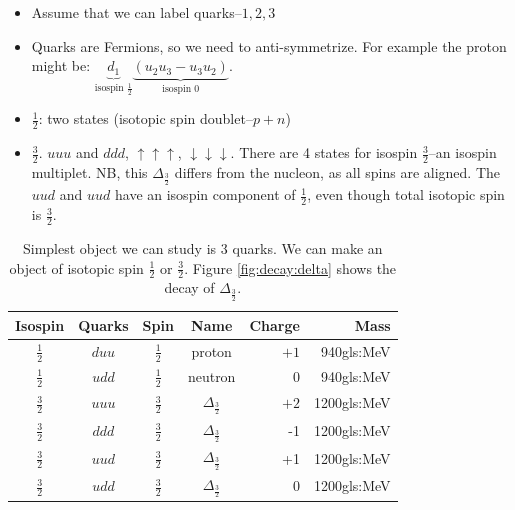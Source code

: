 \documentclass[]{article}
\begin{document}
\begin{itemize}
	\item Assume that we can label quarks--${1,2,3}$
	\item Quarks are Fermions, so we need to anti-symmetrize. For example the proton might be: $\underbrace{d_1}_\text{isospin $\frac{1}{2}$}\underbrace{(u_2u_3-u_3u_2)}_\text{isospin 0}$.
	\item $\frac{1}{2}$: two states (isotopic spin doublet--$p+n$)
	\item $\frac{3}{2}$. $uuu$ and $ddd$, $\uparrow\uparrow\uparrow$, $\downarrow\downarrow\downarrow$. There are 4 states for isospin $\frac{3}{2}$--an isospin multiplet. NB, this $\Delta_\frac{3}{2}$ differs from the nucleon, as all spins are aligned. The $uud$ and $uud$ have an isospin component of $\frac{1}{2}$, even though total isotopic spin is $\frac{3}{2}$.
\end{itemize}

\begin{table}[H]
	\begin{center}
		\caption[Simplest object we can study is 3 quarks.]{Simplest object we can study is 3 quarks. We can make an object of isotopic spin $\frac{1}{2}$ or $\frac{3}{2}$. Figure \ref{fig:decay:delta} shows the decay of $\Delta_\frac{3}{2}$.}\label{table:3quark}
		\begin{tabular}{|c|c|c|c|r|r|}\hline
			Isospin&Quarks&Spin&Name&Charge&Mass\\ \hline
			$\frac{1}{2}$&$duu$&$\frac{1}{2}$&proton&$+1$&940\gls{gls:MeV}\\ \hline
			$\frac{1}{2}$&$udd$&$\frac{1}{2}$&neutron&0&940\gls{gls:MeV}\\ \hline
			$\frac{3}{2}$&$uuu$&$\frac{3}{2}$&$\Delta_\frac{3}{2}$&$+2$&1200\gls{gls:MeV}\\ \hline
			$\frac{3}{2}$&$ddd$&$\frac{3}{2}$&$\Delta_\frac{3}{2}$&-1&1200\gls{gls:MeV}\\ \hline
			$\frac{3}{2}$&$uud$&$\frac{3}{2}$&$\Delta_\frac{3}{2}$&+1&1200\gls{gls:MeV}\\ \hline
			$\frac{3}{2}$&$udd$&$\frac{3}{2}$&$\Delta_\frac{3}{2}$&0&1200\gls{gls:MeV}\\ \hline
		\end{tabular}
	\end{center}
\end{table}
\end{document}
